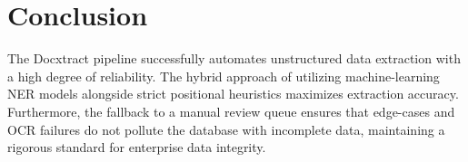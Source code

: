 \documentclass[12pt,a4paper]{article}
\begin{document}
\section{Conclusion}
The Docxtract pipeline successfully automates unstructured data extraction with a high degree of reliability. The hybrid approach of utilizing machine-learning NER models alongside strict positional heuristics maximizes extraction accuracy. Furthermore, the fallback to a manual review queue ensures that edge-cases and OCR failures do not pollute the database with incomplete data, maintaining a rigorous standard for enterprise data integrity.
\end{document}
